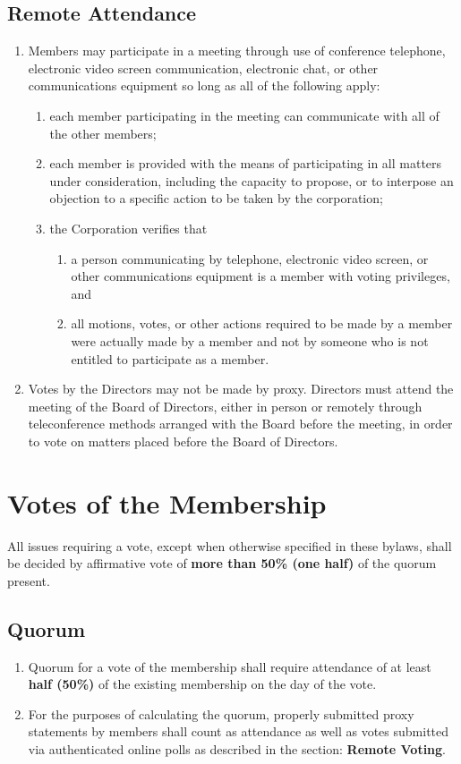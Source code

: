 \documentclass{article}
\begin{document}
\subsection{Remote Attendance}
\begin{enumerate}
    \item Members may participate in a meeting through use of conference
    telephone, electronic video screen communication, electronic chat, or other
    communications equipment so long as all of the following apply:
    \begin{enumerate}
        \item each member participating in the meeting can communicate with all
        of the other members;
        \item each member is provided with the means of participating in all
        matters under consideration, including the capacity to propose, or to
        interpose an objection to a specific action to be taken by the
        corporation;
        \item the Corporation verifies that
        \begin{enumerate}
            \item a person communicating by telephone, electronic video screen,
        or other communications equipment is a member with voting privileges,
        and
            \item all motions, votes, or other actions required to be made by a
        member were actually made by a member and not by someone who is not
        entitled to participate as a member.
        \end{enumerate}
    \end{enumerate}
    \item Votes by the Directors may not be made by proxy. Directors must attend
    the meeting of the Board of Directors, either in person or remotely through
    teleconference methods arranged with the Board before the meeting, in order
    to vote on matters placed before the Board of Directors.
\end{enumerate}
\section{Votes of the Membership}
All issues requiring a vote, except when otherwise specified in these bylaws, shall be decided by affirmative vote of \textbf{more than 50\% (one half)} of the quorum present.
\subsection{Quorum}
\begin{enumerate}
\item Quorum for a vote of the membership shall require attendance of at least \textbf{half (50\%)} of the existing membership on the day of the vote.
\item For the purposes of calculating the quorum, properly submitted proxy statements by members shall count as attendance as well as votes submitted via authenticated online polls as described in the section: \textbf{Remote Voting}.
\end{enumerate}
\end{document}
